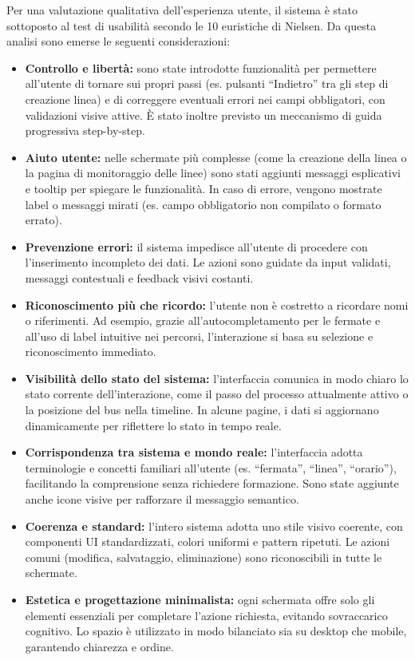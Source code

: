Per una valutazione qualitativa dell’esperienza utente, il sistema è stato sottoposto al test di usabilità secondo le 10 euristiche di Nielsen. Da questa analisi sono emerse le seguenti considerazioni:
\begin{itemize}
    \item \textbf{Controllo e libertà:} sono state introdotte funzionalità per permettere all’utente di tornare sui propri passi (es. pulsanti “Indietro” tra gli step di creazione linea) e di correggere eventuali errori nei campi obbligatori, con validazioni visive attive. È stato inoltre previsto un meccanismo di guida progressiva step-by-step.
    \item \textbf{Aiuto utente:} nelle schermate più complesse (come la creazione della linea o la pagina di monitoraggio delle linee) sono stati aggiunti messaggi esplicativi e tooltip per spiegare le funzionalità. In caso di errore, vengono mostrate label o messaggi mirati (es. campo obbligatorio non compilato o formato errato).
    \item \textbf{Prevenzione errori:} il sistema impedisce all’utente di procedere con l’inserimento incompleto dei dati. Le azioni sono guidate da input validati, messaggi contestuali e feedback visivi costanti.
    \item \textbf{Riconoscimento più che ricordo:} l’utente non è costretto a ricordare nomi o riferimenti. Ad esempio, grazie all’autocompletamento per le fermate e all’uso di label intuitive nei percorsi, l’interazione si basa su selezione e riconoscimento immediato.
    \item \textbf{Visibilità dello stato del sistema:}  l’interfaccia comunica in modo chiaro lo stato corrente dell’interazione, come il passo del processo attualmente attivo o la posizione del bus nella timeline. In alcune pagine, i dati si aggiornano dinamicamente per riflettere lo stato in tempo reale.
    \item \textbf{Corrispondenza tra sistema e mondo reale:} l’interfaccia adotta terminologie e concetti familiari all’utente (es. “fermata”, “linea”, “orario”), facilitando la comprensione senza richiedere formazione. Sono state aggiunte anche icone visive per rafforzare il messaggio semantico.
    \item \textbf{Coerenza e standard:} l’intero sistema adotta uno stile visivo coerente, con componenti UI standardizzati, colori uniformi e pattern ripetuti. Le azioni comuni (modifica, salvataggio, eliminazione) sono riconoscibili in tutte le schermate.
    \item \textbf{Estetica e progettazione minimalista:} ogni schermata offre solo gli elementi essenziali per completare l’azione richiesta, evitando sovraccarico cognitivo. Lo spazio è utilizzato in modo bilanciato sia su desktop che mobile, garantendo chiarezza e ordine.

\end{itemize}

